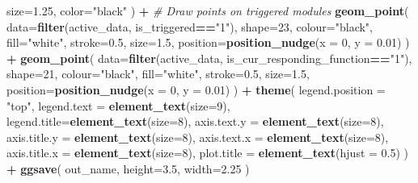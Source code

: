 \documentclass[
]{book}
\newenvironment{Shaded}{\begin{snugshade}}{\end{snugshade}}
\newcommand{\CommentTok}[1]{\textcolor[rgb]{0.56,0.35,0.01}{\textit{#1}}}
\newcommand{\DataTypeTok}[1]{\textcolor[rgb]{0.13,0.29,0.53}{#1}}
\newcommand{\DecValTok}[1]{\textcolor[rgb]{0.00,0.00,0.81}{#1}}
\newcommand{\FloatTok}[1]{\textcolor[rgb]{0.00,0.00,0.81}{#1}}
\newcommand{\KeywordTok}[1]{\textcolor[rgb]{0.13,0.29,0.53}{\textbf{#1}}}
\newcommand{\NormalTok}[1]{#1}
\newcommand{\OperatorTok}[1]{\textcolor[rgb]{0.81,0.36,0.00}{\textbf{#1}}}
\newcommand{\StringTok}[1]{\textcolor[rgb]{0.31,0.60,0.02}{#1}}
\begin{document}
\begin{Shaded}
\begin{Highlighting}[]
    \DataTypeTok{size=}\FloatTok{1.25}\NormalTok{,}
    \DataTypeTok{color=}\StringTok{"black"}
\NormalTok{  ) }\OperatorTok{+}
\StringTok{  }\CommentTok{\# Draw points on triggered modules}
\StringTok{  }\KeywordTok{geom\_point}\NormalTok{(}
    \DataTypeTok{data=}\KeywordTok{filter}\NormalTok{(active\_data, is\_triggered}\OperatorTok{==}\StringTok{"1"}\NormalTok{),}
    \DataTypeTok{shape=}\DecValTok{23}\NormalTok{,}
    \DataTypeTok{colour=}\StringTok{"black"}\NormalTok{,}
    \DataTypeTok{fill=}\StringTok{"white"}\NormalTok{,}
    \DataTypeTok{stroke=}\FloatTok{0.5}\NormalTok{,}
    \DataTypeTok{size=}\FloatTok{1.5}\NormalTok{,}
    \DataTypeTok{position=}\KeywordTok{position\_nudge}\NormalTok{(}\DataTypeTok{x =} \DecValTok{0}\NormalTok{, }\DataTypeTok{y =} \FloatTok{0.01}\NormalTok{)}
\NormalTok{  ) }\OperatorTok{+}
\StringTok{  }\KeywordTok{geom\_point}\NormalTok{(}
    \DataTypeTok{data=}\KeywordTok{filter}\NormalTok{(active\_data, is\_cur\_responding\_function}\OperatorTok{==}\StringTok{"1"}\NormalTok{),}
    \DataTypeTok{shape=}\DecValTok{21}\NormalTok{,}
    \DataTypeTok{colour=}\StringTok{"black"}\NormalTok{,}
    \DataTypeTok{fill=}\StringTok{"white"}\NormalTok{,}
    \DataTypeTok{stroke=}\FloatTok{0.5}\NormalTok{,}
    \DataTypeTok{size=}\FloatTok{1.5}\NormalTok{,}
    \DataTypeTok{position=}\KeywordTok{position\_nudge}\NormalTok{(}\DataTypeTok{x =} \DecValTok{0}\NormalTok{, }\DataTypeTok{y =} \FloatTok{0.01}\NormalTok{)}
\NormalTok{  ) }\OperatorTok{+}
\StringTok{  }\KeywordTok{theme}\NormalTok{(}
    \DataTypeTok{legend.position =} \StringTok{"top"}\NormalTok{,}
    \DataTypeTok{legend.text =} \KeywordTok{element\_text}\NormalTok{(}\DataTypeTok{size=}\DecValTok{9}\NormalTok{),}
    \DataTypeTok{legend.title=}\KeywordTok{element\_text}\NormalTok{(}\DataTypeTok{size=}\DecValTok{8}\NormalTok{),}
    \DataTypeTok{axis.text.y =} \KeywordTok{element\_text}\NormalTok{(}\DataTypeTok{size=}\DecValTok{8}\NormalTok{),}
    \DataTypeTok{axis.title.y =} \KeywordTok{element\_text}\NormalTok{(}\DataTypeTok{size=}\DecValTok{8}\NormalTok{),}
    \DataTypeTok{axis.text.x =} \KeywordTok{element\_text}\NormalTok{(}\DataTypeTok{size=}\DecValTok{8}\NormalTok{),}
    \DataTypeTok{axis.title.x =} \KeywordTok{element\_text}\NormalTok{(}\DataTypeTok{size=}\DecValTok{8}\NormalTok{),}
    \DataTypeTok{plot.title =} \KeywordTok{element\_text}\NormalTok{(}\DataTypeTok{hjust =} \FloatTok{0.5}\NormalTok{)}
\NormalTok{  ) }\OperatorTok{+}
\StringTok{  }\KeywordTok{ggsave}\NormalTok{(}
\NormalTok{    out\_name,}
    \DataTypeTok{height=}\FloatTok{3.5}\NormalTok{,}
    \DataTypeTok{width=}\FloatTok{2.25}
\NormalTok{  )}
\end{Highlighting}
\end{Shaded}
\end{document}
